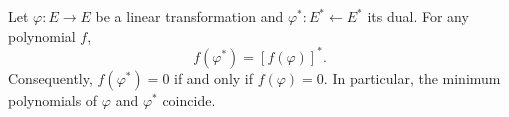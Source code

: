 Let $\varphi: E \to E$ be a linear transformation and $\varphi^*: E^* \leftarrow E^*$ its dual. For any polynomial $f$,
$$f(\varphi^*) = [f(\varphi)]^*.$$
Consequently, $f(\varphi^*) = 0$ if and only if $f(\varphi) = 0$. In particular, the minimum polynomials of $\varphi$ and $\varphi^*$ coincide.
